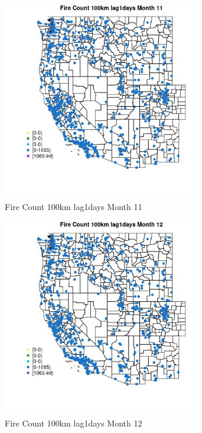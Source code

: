 \begin{figure} 
\centering  
\includegraphics[width=0.77\textwidth]{Code_Outputs/Report_ML_input_PM25_Step4_part_f_de_duplicated_aveswNAs_MapObsMo11Fire_Count_100km_lag1days.jpg} 
\caption{\label{fig:Report_ML_input_PM25_Step4_part_f_de_duplicated_aveswNAsMapObsMo11Fire_Count_100km_lag1days}Fire Count 100km lag1days Month 11} 
\end{figure} 
 

\begin{figure} 
\centering  
\includegraphics[width=0.77\textwidth]{Code_Outputs/Report_ML_input_PM25_Step4_part_f_de_duplicated_aveswNAs_MapObsMo12Fire_Count_100km_lag1days.jpg} 
\caption{\label{fig:Report_ML_input_PM25_Step4_part_f_de_duplicated_aveswNAsMapObsMo12Fire_Count_100km_lag1days}Fire Count 100km lag1days Month 12} 
\end{figure} 
 

